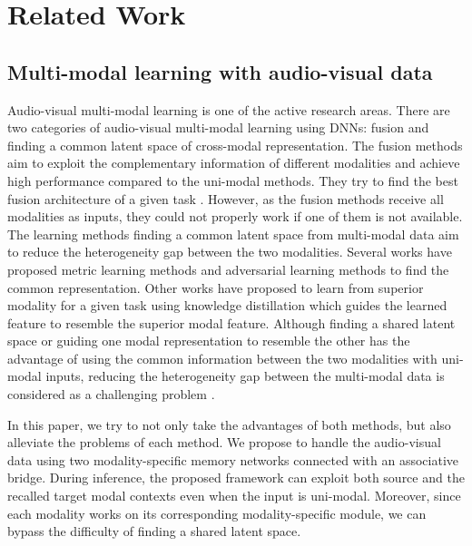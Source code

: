 \documentclass[10pt,twocolumn,letterpaper]{article}
\begin{document}
\section{Related Work}

\subsection{Multi-modal learning with audio-visual data}
Audio-visual multi-modal learning is one of the active research areas. There are two categories of audio-visual multi-modal learning using DNNs: fusion and finding a common latent space of cross-modal representation. The fusion methods \cite{tao2020avsr_multi, nefian2002avsr4, dupont2000avsr1} aim to exploit the complementary information of different modalities and achieve high performance compared to the uni-modal methods. They try to find the best fusion architecture of a given task \cite{afouras2018deep,neti2000avsr2,noda2015avsr3,lee2008avsr5}. However, as the fusion methods receive all modalities as inputs, they could not properly work if one of them is not available. The learning methods finding a common latent space from multi-modal data \cite{ngiam2011multimodal,hu2019sdml,andrew2013dcca,kan2016mvdn} aim to reduce the heterogeneity gap between the two modalities. Several works \cite{Chung16sync,chung2019perfect,feng2014crmr1} have proposed metric learning methods and adversarial learning methods to find the common representation. Other works \cite{zhao2020hearing, afouras2020asr} have proposed to learn from superior modality for a given task using knowledge distillation \cite{hinton2015distilling} which guides the learned feature to resemble the superior modal feature. 
Although finding a shared latent space or guiding one modal representation to resemble the other has the advantage of using the common information between the two modalities with uni-modal inputs, reducing the heterogeneity gap between the multi-modal data is considered as a challenging problem \cite{zhen2019dscmr,peng2019cmgan}.

In this paper, we try to not only take the advantages of both methods, but also alleviate the problems of each method. We propose to handle the audio-visual data using two modality-specific memory networks connected with an associative bridge. During inference, the proposed framework can exploit both source and the recalled target modal contexts even when the input is uni-modal. Moreover, since each modality works on its corresponding modality-specific module, we can bypass the difficulty of finding a shared latent space.
\end{document}
